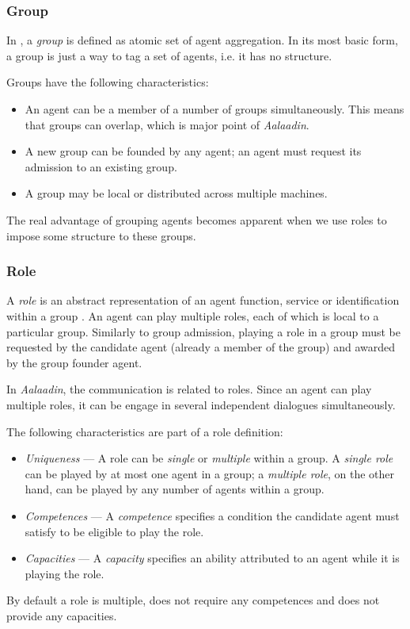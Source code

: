 \subsubsection*{Group}

In \cite{Ferber97}, a \textit{group} is defined as atomic set of agent aggregation.
In its most basic form, a group is just a way to tag a set of agents, i.e. it has no structure.

Groups have the following characteristics:
\begin{itemize}
	\item An agent can be a member of a number of groups simultaneously.
	This means that groups can overlap, which is major point of \textit{Aalaadin}.
	\item A new group can be founded by any agent; an agent must request its admission to an existing group.
	\item A group may be local or distributed across multiple machines.
\end{itemize}

The real advantage of grouping agents becomes apparent when we use roles to impose some structure to these groups.

\subsubsection*{Role}

A \textit{role} is an abstract representation of an agent function, service or identification within a group \cite{Ferber97}.
An agent can play multiple roles, each of which is local to a particular group.
Similarly to group admission, playing a role in a group must be requested by the candidate agent (already a member of the group) and awarded by the group founder agent.

In \textit{Aalaadin}, the communication is related to roles. Since an agent can play multiple roles, it can be engage in several independent dialogues simultaneously.

The following characteristics are part of a role definition:
\begin{itemize}
	\item \textit{Uniqueness} ---  A role can be \textit{single} or \textit{multiple} within a group.
	A \textit{single role} can be played by at most one agent in a group; a \textit{multiple role}, on the other hand, can be played by any number of agents within a group. 
	\item \textit{Competences} --- A \textit{competence} specifies a condition the candidate agent must satisfy to be eligible to play the role.
	\item \textit{Capacities} --- A \textit{capacity} specifies an ability attributed to an agent while it is playing the role.
\end{itemize}
By default a role is multiple, does not require any competences and does not provide any capacities.


